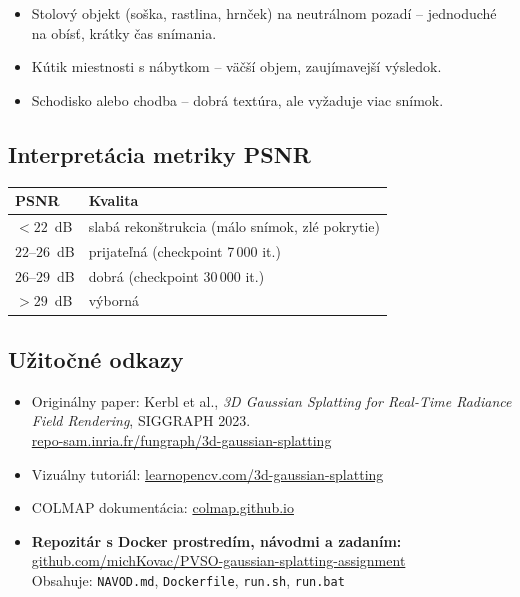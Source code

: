 \documentclass{article}
\begin{document}
\begin{itemize}
    \item Stolový objekt (soška, rastlina, hrnček) na neutrálnom pozadí –
          jednoduché na obísť, krátky čas snímania.
    \item Kútik miestnosti s nábytkom – väčší objem, zaujímavejší výsledok.
    \item Schodisko alebo chodba – dobrá textúra, ale vyžaduje viac snímok.
\end{itemize}

\subsection*{Interpretácia metriky PSNR}

\begin{center}
\begin{tabular}{ll}
\toprule
PSNR & Kvalita \\
\midrule
$< 22$~dB & slabá rekonštrukcia (málo snímok, zlé pokrytie) \\
$22$–$26$~dB & prijateľná (checkpoint 7\,000 it.) \\
$26$–$29$~dB & dobrá (checkpoint 30\,000 it.) \\
$> 29$~dB & výborná \\
\bottomrule
\end{tabular}
\end{center}

\subsection*{Užitočné odkazy}

\begin{itemize}
    \item Originálny paper: Kerbl et al., \textit{3D Gaussian Splatting for
          Real-Time Radiance Field Rendering}, SIGGRAPH 2023.\\
          \href{https://repo-sam.inria.fr/fungraph/3d-gaussian-splatting/}{repo-sam.inria.fr/fungraph/3d-gaussian-splatting}
    \item Vizuálny tutoriál:
          \href{https://learnopencv.com/3d-gaussian-splatting/}{learnopencv.com/3d-gaussian-splatting}
    \item COLMAP dokumentácia:
          \href{https://colmap.github.io/}{colmap.github.io}
    \item \textbf{Repozitár s Docker prostredím, návodmi a zadaním:}\\
          \href{https://github.com/michKovac/PVSO-gaussian-splatting-assignment}{github.com/michKovac/PVSO-gaussian-splatting-assignment}\\
          Obsahuje: \texttt{NAVOD.md}, \texttt{Dockerfile}, \texttt{run.sh}, \texttt{run.bat}
\end{itemize}
\end{document}
